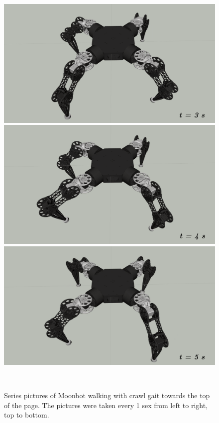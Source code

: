 \begin{figure}[t]
\begin{minipage}[b]{0.32\textwidth}
  \end{minipage}\\
  \begin{minipage}[b]{0.32\textwidth}
    \centering
    \includegraphics[clip, width=\textwidth]{./fig/chap4/gait/crawl/c_zmp2.png}
  \end{minipage}
  \begin{minipage}[b]{0.32\textwidth}
    \centering
    \includegraphics[clip, width=\textwidth]{./fig/chap4/gait/crawl/c_step3.png}
  \end{minipage}
  \begin{minipage}[b]{0.32\textwidth}
    \centering
    \includegraphics[clip, width=\textwidth]{./fig/chap4/gait/crawl/c_step4.png}
  \end{minipage}\\
\caption{Series pictures of Moonbot walking with crawl gait towards the top of the page. The pictures were taken every 1 sex from left to right, top to bottom.}
\label{crawlsnap}
\end{figure}

